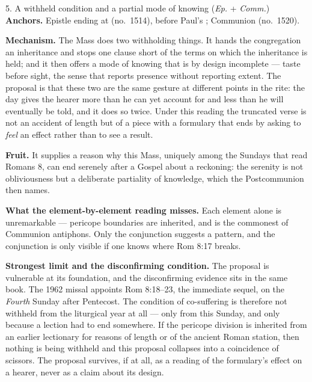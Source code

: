 \begin{proposal}{5. A withheld condition and a partial mode of knowing
\normalfont(\emph{Ep.} + \emph{Comm.})}
\textbf{Anchors.} Epistle ending at  (no.\ 1514),
before Paul's ; Communion
 (no.\ 1520).

\textbf{Mechanism.} The Mass does two withholding things. It hands the
congregation an inheritance and stops one clause short of the terms on which the
inheritance is held; and it then offers a mode of knowing that is by design
incomplete --- taste before sight, the sense that reports presence without
reporting extent. The proposal is that these two are the same gesture at
different points in the rite: the day gives the hearer more than he can yet
account for and less than he will eventually be told, and it does so twice.
Under this reading the truncated verse is not an accident of length but of a
piece with a formulary that ends by asking to \emph{feel} an effect rather than
to see a result.

\textbf{Fruit.} It supplies a reason why this Mass, uniquely among the Sundays
that read Romans 8, can end serenely after a Gospel about a reckoning: the
serenity is not obliviousness but a deliberate partiality of knowledge, which
the Postcommunion then names.

\textbf{What the element-by-element reading misses.} Each element alone is
unremarkable --- pericope boundaries are inherited, and  is the commonest of Communion antiphons. Only the conjunction suggests a
pattern, and the conjunction is only visible if one knows where Rom 8:17 breaks.

\textbf{Strongest limit and the disconfirming condition.} The proposal is
vulnerable at its foundation, and the disconfirming evidence sits in the same
book. The 1962 missal appoints Rom 8:18--23, the immediate sequel, on the
\emph{Fourth} Sunday after Pentecost. The condition of co-suffering is therefore
not withheld from the liturgical year at all --- only from this Sunday, and only
because a lection had to end somewhere. If the pericope division is inherited
from an earlier lectionary for reasons of length or of the ancient Roman
station, then nothing is being withheld and this proposal collapses into a
coincidence of scissors. The proposal survives, if at all, as a reading of the
formulary's effect on a hearer, never as a claim about its design.
\end{proposal}

